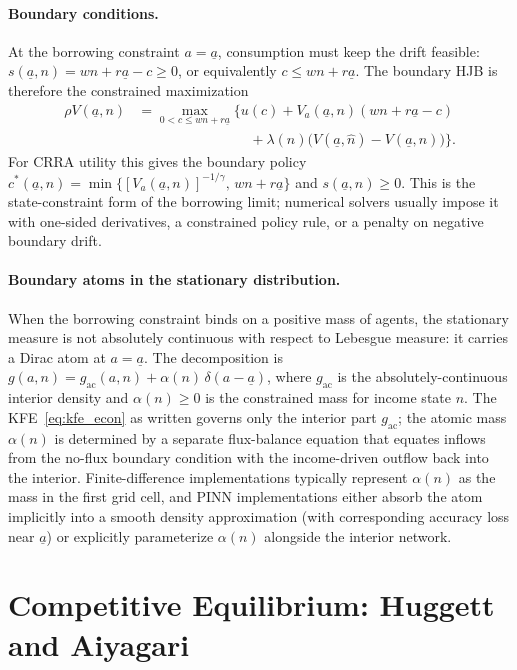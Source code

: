 \documentclass[11pt,a4paper]{report}
\begin{document}
\paragraph{Boundary conditions.}  At the borrowing constraint $a = \underline{a}$, consumption must keep the drift feasible: $s(\underline{a},n)=wn+r\underline{a}-c \geq 0$, or equivalently $c \leq wn+r\underline{a}$.  The boundary HJB is therefore the constrained maximization
\[
\begin{aligned}
\rho V(\underline{a},n)
&=\max_{0<c\leq wn+r\underline{a}}
\Big\{u(c)+V_a(\underline{a},n)(wn+r\underline{a}-c)\\
&\qquad\qquad\qquad\qquad
+\lambda(n)\bigl(V(\underline{a},\hat n)-V(\underline{a},n)\bigr)\Big\}.
\end{aligned}
\]
For CRRA utility this gives the boundary policy $c^*(\underline{a},n)=\min\{[V_a(\underline{a},n)]^{-1/\gamma},\,wn+r\underline{a}\}$ and $s(\underline{a},n)\geq 0$.  This is the state-constraint form of the borrowing limit; numerical solvers usually impose it with one-sided derivatives, a constrained policy rule, or a penalty on negative boundary drift.

\paragraph{Boundary atoms in the stationary distribution.}
When the borrowing constraint binds on a positive mass of agents, the stationary measure is not absolutely continuous with respect to Lebesgue measure: it carries a Dirac atom at $a=\underline a$.  The decomposition is $g(a,n) = g_{\mathrm{ac}}(a,n) + \alpha(n)\,\delta(a-\underline a)$, where $g_{\mathrm{ac}}$ is the absolutely-continuous interior density and $\alpha(n)\geq 0$ is the constrained mass for income state $n$.  The KFE~\eqref{eq:kfe_econ} as written governs only the interior part $g_{\mathrm{ac}}$; the atomic mass $\alpha(n)$ is determined by a separate flux-balance equation that equates inflows from the no-flux boundary condition with the income-driven outflow back into the interior.  Finite-difference implementations typically represent $\alpha(n)$ as the mass in the first grid cell, and PINN implementations either absorb the atom implicitly into a smooth density approximation (with corresponding accuracy loss near $\underline a$) or explicitly parameterize $\alpha(n)$ alongside the interior network.

\section{Competitive Equilibrium: Huggett and Aiyagari}
\label{sec:ct_equilibrium}
\end{document}
